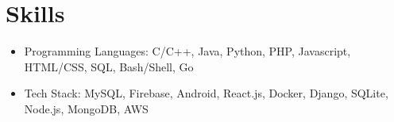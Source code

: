 \documentclass{resume}
\begin{document}
\section{Skills}
\begin{itemize}[parsep=0.5ex]
  \item Programming Languages: C/C++, Java, Python, PHP, Javascript, HTML/CSS, SQL, Bash/Shell, Go
  \item Tech Stack: MySQL, Firebase, Android, React.js, Docker, Django, SQLite, Node.js, MongoDB, AWS
\end{itemize}
\end{document}
